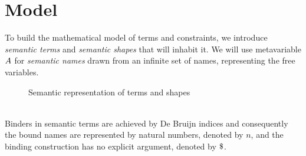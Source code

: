 \documentclass[english, mgr]{iithesis}
\renewcommand{\it}[1]{\textit{#1}}
\begin{document}
\section{Model}
To build the mathematical model of terms and constraints,
we introduce \it{semantic terms} and \it{semantic shapes} that will inhabit it.
We will use metavariable $A$ for \it{semantic names} drawn from an
infinite set of names, representing the free variables.
\begin{figure}[htbp]
  \centering
  \caption{Semantic representation of terms and shapes}
  \label{fig:semantic-terms-shapes}
\end{figure}
\\
Binders in semantic terms are achieved by De Bruijn indices\cite{deBruijn} and consequently
the bound names are represented by natural numbers, denoted by $n$,
and the binding construction has no explicit argument, denoted by $\stbind$.
\end{document}
